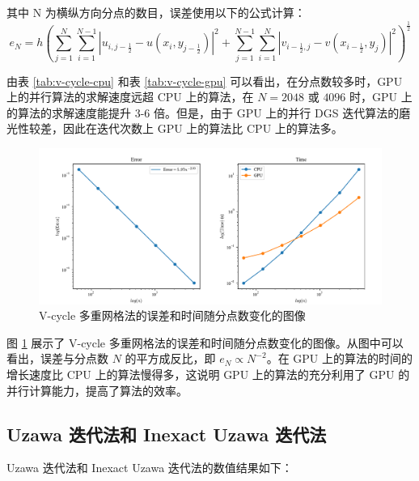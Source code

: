 \documentclass{article}
\begin{document}
其中 N 为横纵方向分点的数目，误差使用以下的公式计算：
\begin{equation*}
    e_N = h\left(\sum_{j=1}^{N}\sum_{i=1}^{N-1}\left|u_{i,j-\frac{1}{2}}-u(x_i,y_{j-\frac{1}{2}})\right|^2 +
    \sum_{j=1}^{N-1}\sum_{i=1}^{N}\left|v_{i-\frac{1}{2},j}-v(x_{i-\frac{1}{2}},y_{j})\right|^2\right)^{\frac{1}{2}}
\end{equation*}

由表 \ref{tab:v-cycle-cpu} 和表 \ref{tab:v-cycle-gpu} 可以看出，在分点数较多时，GPU 上的并行算法的求解速度远超 CPU 上的算法，在 $N=2048$ 或 $4096$ 时，GPU 上的算法的求解速度能提升 3-6 倍。但是，由于 GPU 上的并行 DGS 迭代算法的磨光性较差，因此在迭代次数上 GPU 上的算法比 CPU 上的算法多。

\begin{figure}[H]
    \centering
    \includegraphics[width=\textwidth]{fig/vcycle.pdf}
    \caption{V-cycle 多重网格法的误差和时间随分点数变化的图像}
    \label{fig:vcycle}
\end{figure}

图 \ref{fig:vcycle} 展示了 V-cycle 多重网格法的误差和时间随分点数变化的图像。从图中可以看出，误差与分点数 $N$ 的平方成反比，即 $e_N\propto N^{-2}$。在 GPU 上的算法的时间的增长速度比 CPU 上的算法慢得多，这说明 GPU 上的算法的充分利用了 GPU 的并行计算能力，提高了算法的效率。

\subsection{Uzawa 迭代法和 Inexact Uzawa 迭代法}

Uzawa 迭代法和 Inexact Uzawa 迭代法的数值结果如下：

\begin{table}[H]
    \centering
    \caption{Uzawa 迭代法的数值结果}
    \label{tab:uzawa}
\end{table}
\end{document}
